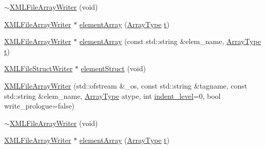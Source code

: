 \begin{DoxyCompactItemize}
\item 
\mbox{\hyperlink{classXMLStructWriterAPI_1_1XMLFileArrayWriter_acfdbf7c2c12e6cbed700fb0fc48977e7}{$\sim$\+X\+M\+L\+File\+Array\+Writer}} (void)
\item 
\mbox{\hyperlink{classXMLStructWriterAPI_1_1XMLFileArrayWriter}{X\+M\+L\+File\+Array\+Writer}} $\ast$ \mbox{\hyperlink{classXMLStructWriterAPI_1_1XMLFileArrayWriter_afc24054ffb39df378f8aeb77e029bd59}{element\+Array}} (\mbox{\hyperlink{namespaceXMLStructWriterAPI_a2017208be87c77a32bdc19ea2f14d032}{Array\+Type}} \mbox{\hyperlink{adat__devel_2lib_2hadron_2hadron__timeslice_8cc_ac310d9181e916ba43604099aee272c71}{t}})
\item 
\mbox{\hyperlink{classXMLStructWriterAPI_1_1XMLFileArrayWriter}{X\+M\+L\+File\+Array\+Writer}} $\ast$ \mbox{\hyperlink{classXMLStructWriterAPI_1_1XMLFileArrayWriter_ad455da07ae5725cffdab8b056681ec2d}{element\+Array}} (const std\+::string \&elem\+\_\+name, \mbox{\hyperlink{namespaceXMLStructWriterAPI_a2017208be87c77a32bdc19ea2f14d032}{Array\+Type}} \mbox{\hyperlink{adat__devel_2lib_2hadron_2hadron__timeslice_8cc_ac310d9181e916ba43604099aee272c71}{t}})
\item 
\mbox{\hyperlink{classXMLStructWriterAPI_1_1XMLFileStructWriter}{X\+M\+L\+File\+Struct\+Writer}} $\ast$ \mbox{\hyperlink{classXMLStructWriterAPI_1_1XMLFileArrayWriter_a53910cfce30307c3333d553b7f018e64}{element\+Struct}} (void)
\item 
\mbox{\hyperlink{classXMLStructWriterAPI_1_1XMLFileArrayWriter_ab4591c76da7c7db03abe6a3e4cf0529a}{X\+M\+L\+File\+Array\+Writer}} (std\+::ofstream \&\+\_\+os, const std\+::string \&tagname, const std\+::string \&elem\+\_\+name, \mbox{\hyperlink{namespaceXMLStructWriterAPI_a2017208be87c77a32bdc19ea2f14d032}{Array\+Type}} atype, int \mbox{\hyperlink{classXMLStructWriterAPI_1_1XMLArrayWriterBase_ac27f8ee3bc74448bce22008dd40bf8da}{indent\+\_\+level}}=0, bool write\+\_\+prologue=false)
\item 
\mbox{\hyperlink{classXMLStructWriterAPI_1_1XMLFileArrayWriter_acfdbf7c2c12e6cbed700fb0fc48977e7}{$\sim$\+X\+M\+L\+File\+Array\+Writer}} (void)
\item 
\mbox{\hyperlink{classXMLStructWriterAPI_1_1XMLFileArrayWriter}{X\+M\+L\+File\+Array\+Writer}} $\ast$ \mbox{\hyperlink{classXMLStructWriterAPI_1_1XMLFileArrayWriter_afc24054ffb39df378f8aeb77e029bd59}{element\+Array}} (\mbox{\hyperlink{namespaceXMLStructWriterAPI_a2017208be87c77a32bdc19ea2f14d032}{Array\+Type}} \mbox{\hyperlink{adat__devel_2lib_2hadron_2hadron__timeslice_8cc_ac310d9181e916ba43604099aee272c71}{t}})

\end{DoxyCompactItemize}
